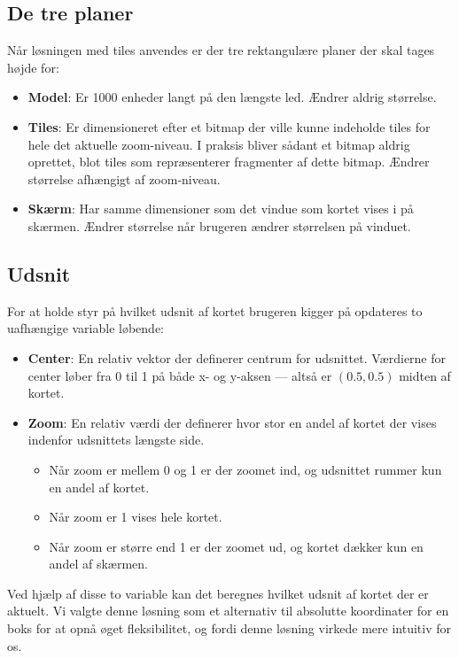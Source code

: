 \subsection{De tre planer}
\label{subsec:deTrePlaner}

Når løsningen med tiles anvendes er der tre rektangulære planer der skal tages højde for:

\begin{itemize}
	\item \textbf{Model}: Er 1000 enheder langt på den længste led. Ændrer aldrig størrelse.
	\item \textbf{Tiles}: Er dimensioneret efter et bitmap der ville kunne indeholde tiles for hele det aktuelle zoom-niveau. I praksis bliver sådant et bitmap aldrig oprettet, blot tiles som repræsenterer fragmenter af dette bitmap. Ændrer størrelse afhængigt af zoom-niveau.
	\item \textbf{Skærm}: Har samme dimensioner som det vindue som kortet vises i på skærmen. Ændrer størrelse når brugeren ændrer størrelsen på vinduet.
\end{itemize}

\subsection{Udsnit}
\label{subsec:udsnit}

For at holde styr på hvilket udsnit af kortet brugeren kigger på opdateres to uafhængige variable løbende:

\begin{itemize}
	\item \textbf{Center}: En relativ vektor der definerer centrum for udsnittet. Værdierne for center løber fra 0 til 1 på både x- og y-aksen --- altså er $(0.5, 0.5)$ midten af kortet.
	\item \textbf{Zoom}: En relativ værdi der definerer hvor stor en andel af kortet der vises indenfor udsnittets længste side.
	\begin{itemize}
		\item Når zoom er mellem 0 og 1 er der zoomet ind, og udsnittet rummer kun en andel af kortet.
		\item Når zoom er 1 vises hele kortet.
		\item Når zoom er større end 1 er der zoomet ud, og kortet dækker kun en andel af skærmen.
	\end{itemize}
\end{itemize}

Ved hjælp af disse to variable kan det beregnes hvilket udsnit af kortet der er aktuelt. Vi valgte denne løsning som et alternativ til absolutte koordinater for en boks for at opnå øget fleksibilitet, og fordi denne løsning virkede mere intuitiv for os.

